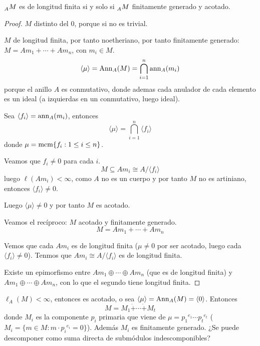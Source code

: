 \begin{lema}
  \(\prescript{}{A}{M}\) es de longitud finita si y solo si
  \(\prescript{}{A}{M}\) finitamente generado y acotado.
\end{lema}
\begin{proof}
  \(M\) distinto del 0, porque si no es trivial.

  \(M\) de longitud finita, por tanto noetheriano, por tanto finitamente
  generado: \(M=Am_1+\cdots+Am_n\), con \(m_i\in M\).
  \[
    \langle\mu\rangle=\operatorname{Ann}_A(M)=\bigcap_{i=1}^n\operatorname{ann}_A(m_i)
  \]
  porque el anillo \(A\) es conmutativo, donde ademas cada anulador
  de cada elemento es un ideal (a izquierdas en un conmutativo, luego ideal).

  Sea \(\langle f_i\rangle=\operatorname{ann}_A(m_i)\), entonces
  \[
    \langle\mu\rangle=\bigcap_{i=1}^n\langle f_i\rangle
  \]
  donde \(\mu=\operatorname{mcm}\{f_i:1\le i\le n\}\).

  Veamos que \(f_i\neq 0\) para cada \(i\).
  \[
    M\subseteq Am_i\cong A/\langle f_i\rangle
  \]
  luego \(\ell(Am_i)<\infty\), como \(A\) no es un cuerpo y por
  tanto \(M\) no es artiniano, entonces
  \(\langle f_i\rangle\neq0\).

  Luego \(\langle\mu\rangle\neq 0\) y por tanto \(M\) es acotado.

  Veamos el recíproco: \(M\) acotado y finitamente generado.
  \[
    M=Am_1+\cdots+Am_n
  \]

  Vemos que cada \(Am_i\) es de longitud finita (\(\mu\neq 0\) por ser
  acotado, luego cada \(\langle f_i\rangle\neq 0\)).
  Tenmos que \(Am_i\cong A/\langle f_i\rangle\) es de longitud finita.

  Existe un epimorfismo entre \(Am_1\oplus\cdots\oplus Am_n\) (que es
  de longitud finita) y \(Am_1\oplus\cdots\oplus Am_n\), con lo que
  el segundo tiene longitud finita.
\end{proof}

\(\ell_A(M)<\infty\), entonces es acotado, o sea
\(\langle\mu\rangle=\operatorname{Ann}_A(M)=\langle 0\rangle\). Entonces
\[
  M=M_1\dot{+}\cdots\dot{+} M_t
\]
donde \(M_i\) es la componente \(p_i\) primaria que viene de
\(\mu={p_1}^{e_1}\cdots{p_t}^{e_t}\)
(\(M_i=\{m\in M:m\cdot{p_i}^{e_i}=0\}\)).
Además \(M_i\) es finitamente generado.
¿Se puede descomponer como suma directa de submódulos indescomponibles?
